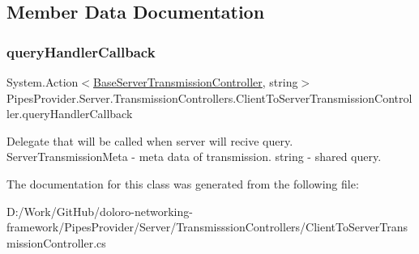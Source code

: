 \subsection{Member Data Documentation}
\mbox{\label{class_pipes_provider_1_1_server_1_1_transmission_controllers_1_1_client_to_server_transmission_controller_a7f1552d5fea75a49edc81af944630f3e}} 
\subsubsection{\texorpdfstring{query\+Handler\+Callback}{queryHandlerCallback}}
{\footnotesize\ttfamily System.\+Action$<$\mbox{\hyperlink{class_pipes_provider_1_1_server_1_1_transmission_controllers_1_1_base_server_transmission_controller}{Base\+Server\+Transmission\+Controller}}, string$>$ Pipes\+Provider.\+Server.\+Transmission\+Controllers.\+Client\+To\+Server\+Transmission\+Controller.\+query\+Handler\+Callback}



Delegate that will be called when server will recive query. Server\+Transmission\+Meta -\/ meta data of transmission. string -\/ shared query. 



The documentation for this class was generated from the following file\+:\begin{DoxyCompactItemize}
\item 
D\+:/\+Work/\+Git\+Hub/doloro-\/networking-\/framework/\+Pipes\+Provider/\+Server/\+Transmisssion\+Controllers/Client\+To\+Server\+Transmission\+Controller.\+cs\end{DoxyCompactItemize}

